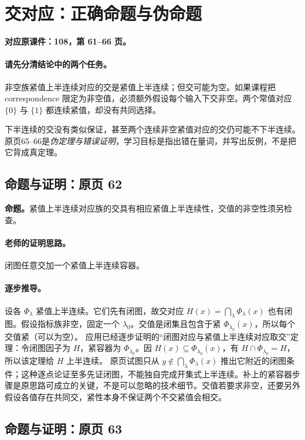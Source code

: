 \clearpage\section{交对应：正确命题与伪命题}\label{g:108:61}

\textbf{对应原课件：108，第 61--66 页。}


\paragraph{请先分清结论中的两个任务。}
非空族紧值上半连续对应的交是紧值上半连续；但交可能为空。如果课程把 correspondence 限定为非空值，必须额外假设每个输入下交非空。两个常值对应 $\{0\}$ 与 $\{1\}$ 都连续紧值，却没有共同选择。

下半连续的交没有类似保证，甚至两个连续非空紧值对应的交仍可能不下半连续。原页65--66是\emph{伪定理与错误证明}，学习目标是指出错在量词，并写出反例，不是把它背成真定理。


\subsection{命题与证明：原页 62}

\textbf{命题。}紧值上半连续对应族的交具有相应紧值上半连续性，交值的非空性须另检查。

\paragraph{老师的证明思路。}闭图任意交加一个紧值上半连续容器。

\paragraph{逐步推导。}
设各 $\Phi_\lambda$ 紧值上半连续。它们先有闭图，故交对应 $H(x)=\bigcap_\lambda\Phi_\lambda(x)$ 也有闭图。假设指标族非空，固定一个 $\lambda_0$。交值是闭集且包含于紧 $\Phi_{\lambda_0}(x)$，所以每个交值紧（可以为空）。
应用已经逐步证明的“闭图对应与紧值上半连续对应取交”定理：令闭图因子为 $H$，紧容器为 $\Phi_{\lambda_0}$。因 $H(x)\subseteq\Phi_{\lambda_0}(x)$，有 $H\cap\Phi_{\lambda_0}=H$，所以该定理给 $H$ 上半连续。
原页试图只从 $y\notin\bigcap_\lambda\Phi_\lambda(x)$ 推出它附近的闭图条件；这种逐点论证至多先证闭图，不能独自完成开集式上半连续。补上的紧容器步骤是原思路可成立的关键，不是可以忽略的技术细节。交值若要求非空，还要另外假设各值存在共同交，紧性本身不保证两个不交紧值会相交。


\subsection{命题与证明：原页 63}

